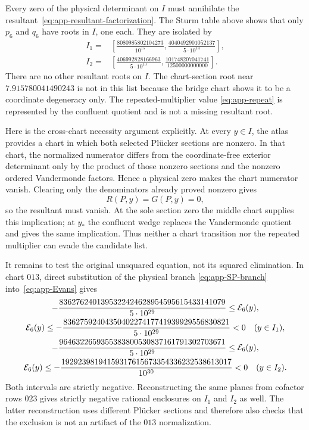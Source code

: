 Every zero of the physical determinant on \(I\) must annihilate the
resultant~\eqref{eq:app-resultant-factorization}.  The Sturm table above
shows that only \(p_6\) and \(q_6\) have roots in \(I\), one each.  They are
isolated by
\begin{align}
 I_1={}&\left[
 \frac{8080985802104273}{10^{15}},
 \frac{4040492901052137}{5\cdot10^{14}}
 \right],                                             \label{eq:app-I1}\\
 I_2={}&\left[
 \frac{406992828166963}{5\cdot10^{13}},
 \frac{101748207041741}{12500000000000}
 \right].                                             \label{eq:app-I2}
\end{align}
There are no other resultant roots on \(I\).  The chart-section root near
\(7.915780041490243\) is not in this list because the bridge chart shows it
to be a coordinate degeneracy only.  The repeated-multiplier value
\eqref{eq:app-repeat} is represented by the confluent quotient and is not a
missing resultant root.

Here is the cross-chart necessity argument explicitly.  At every
\(y\in I\), the atlas provides a chart in which both selected Pl\"ucker
sections are nonzero.  In that chart, the normalized numerator differs from
the coordinate-free exterior determinant only by the product of those
nonzero sections and the nonzero ordered Vandermonde factors.  Hence a
physical zero makes the chart numerator vanish.  Clearing only the
denominators already proved nonzero gives
\[
R(P,y)=G(P,y)=0,
\]
so the resultant must vanish.  At the sole section zero the middle chart
supplies this implication; at \(y_*\) the confluent wedge replaces the
Vandermonde quotient and gives the same implication.  Thus neither a chart
transition nor the repeated multiplier can evade the candidate list.

It remains to test the original unsquared equation, not its squared
elimination.  In chart \(013\), direct substitution of the physical branch
\eqref{eq:app-SP-branch} into~\eqref{eq:app-Evans} gives
\begin{gather}
-\frac{8362762401395322424628954595615433141079}{5\cdot10^{29}}
\leq \mathcal E_6(y), \notag\\
\mathcal E_6(y)\leq
-\frac{8362759240435040227417741939929556830821}{5\cdot10^{29}}
<0\quad (y\in I_1),                                   \label{eq:app-I1-sign}\\
-\frac{9646322659355383800530837161791302703671}{5\cdot10^{29}}
\leq \mathcal E_6(y), \notag\\
\mathcal E_6(y)\leq
-\frac{19292398194159317615673354336232538613017}{10^{30}}
<0\quad (y\in I_2).                                   \label{eq:app-I2-sign}
\end{gather}
Both intervals are strictly negative.  Reconstructing the same planes from
cofactor rows \(023\) gives strictly negative rational enclosures on
\(I_1\) and \(I_2\) as well.  The latter reconstruction uses different
Pl\"ucker sections and therefore also checks that the exclusion is not an
artifact of the \(013\) normalization.

